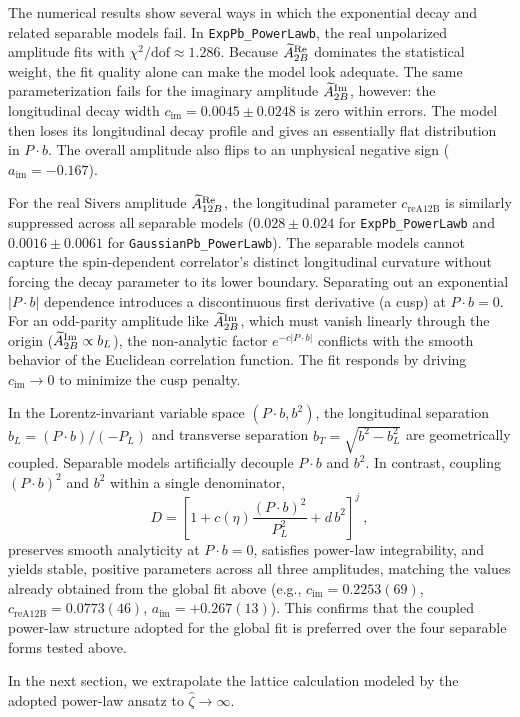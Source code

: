 The numerical results show several ways in which the exponential decay and related separable models fail. In \texttt{ExpPb\_PowerLawb}, the real unpolarized amplitude fits with $\chi^2/\text{dof} \approx 1.286$. Because $\widetilde{A}_{2B}^{\text{Re}}$ dominates the statistical weight, the fit quality alone can make the model look adequate. The same parameterization fails for the imaginary amplitude $\widetilde{A}_{2B}^{\text{Im}}$, however: the longitudinal decay width $c_{\text{im}} = 0.0045 \pm 0.0248$ is zero within errors. The model then loses its longitudinal decay profile and gives an essentially flat distribution in $P\cdot b$. The overall amplitude also flips to an unphysical negative sign ($a_{\text{im}} = -0.167$).

For the real Sivers amplitude $\widetilde{A}_{12B}^{\text{Re}}$, the longitudinal parameter $c_{\text{reA12B}}$ is similarly suppressed across all separable models ($0.028 \pm 0.024$ for \texttt{ExpPb\_\allowbreak PowerLawb} and $0.0016 \pm 0.0061$ for \texttt{GaussianPb\_\allowbreak PowerLawb}). The separable models cannot capture the spin-dependent correlator's distinct longitudinal curvature without forcing the decay parameter to its lower boundary. Separating out an exponential $|P\cdot b|$ dependence introduces a discontinuous first derivative (a cusp) at $P\cdot b = 0$. For an odd-parity amplitude like $\widetilde{A}_{2B}^{\text{Im}}$, which must vanish linearly through the origin ($\widetilde{A}_{2B}^{\text{Im}} \propto b_L$), the non-analytic factor $e^{-c|P\cdot b|}$ conflicts with the smooth behavior of the Euclidean correlation function. The fit responds by driving $c_{\text{im}} \to 0$ to minimize the cusp penalty.

In the Lorentz-invariant variable space $(P\cdot b, b^2)$, the longitudinal separation $b_L = (P\cdot b)/(-P_L)$ and transverse separation $b_T = \sqrt{b^2 - b_L^2}$ are geometrically coupled. Separable models artificially decouple $P\cdot b$ and $b^2$. In contrast, coupling $(P\cdot b)^2$ and $b^2$ within a single denominator,
    \begin{equation}
        D = \left[ 1 + c(\eta) \frac{(P\cdot b)^2}{P_L^2} + d\,b^2 \right]^j \ ,
    \end{equation}
preserves smooth analyticity at $P\cdot b = 0$, satisfies power-law integrability, and yields stable, positive parameters across all three amplitudes, matching the values already obtained from the global fit above (e.g., $c_{\text{im}} = 0.2253(69)$, $c_{\text{reA12B}} = 0.0773(46)$, $a_{\text{im}} = +0.267(13)$). This confirms that the coupled power-law structure adopted for the global fit is preferred over the four separable forms tested above.

In the next section, we extrapolate the lattice calculation modeled by the adopted power-law ansatz to $\hat{\zeta}\rightarrow\infty$.

\pagebreak

